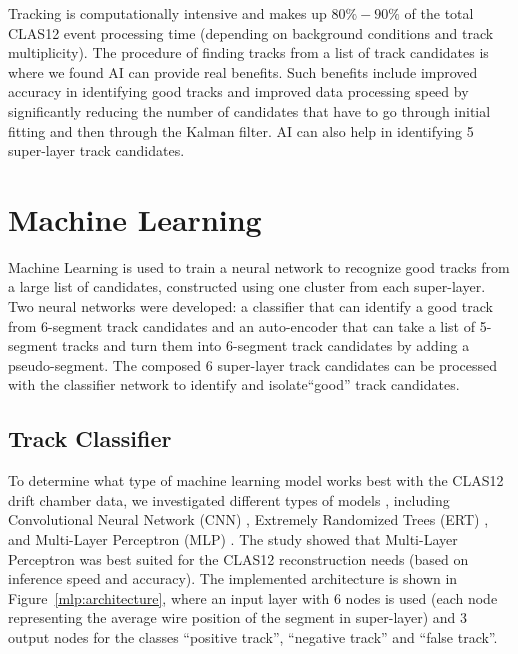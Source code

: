 \documentclass[aps,prl,preprint,12pt]{revtex4}
\begin{document}
Tracking is computationally intensive and makes up $80\%-90\%$ of the total CLAS12 event processing 
time (depending on background conditions and track multiplicity). The procedure of finding tracks from a 
list of track candidates is where we found AI can provide real benefits. Such benefits include improved 
accuracy in identifying good tracks and improved data processing speed by significantly reducing the 
number of candidates that have to go through initial fitting and then through the Kalman filter. AI can also 
help in identifying 5 super-layer track candidates.

\section{Machine Learning}

Machine Learning is used to train a neural network to recognize good tracks
 from a large list of candidates, constructed using one cluster from each super-layer.
 Two neural networks were developed: a classifier that can identify a good track from  
 6-segment track candidates and an auto-encoder that can take a list of 5-segment tracks 
 and turn them into 6-segment track candidates by adding a pseudo-segment. The composed 
 6 super-layer track candidates can be processed with the classifier network to identify and 
 isolate``good'' track candidates.


 
 \subsection{Track Classifier}
 
 To determine what type of machine learning model works best with the CLAS12 drift chamber data, 
 we investigated different types of models  \cite{Gavalian:2020oxg}, including Convolutional Neural 
 Network (CNN) , Extremely Randomized Trees (ERT) \cite{scikitlearn-extratreesclassifier}, and 
 Multi-Layer Perceptron (MLP) \cite{scikitlearn-mlpclassifier}. The study showed that Multi-Layer 
 Perceptron was best suited for the CLAS12 reconstruction needs (based on inference speed and accuracy). 
 The implemented architecture is shown in Figure~\ref{mlp:architecture}, where an input layer with 6 
 nodes is used (each node representing the average wire position of the segment in super-layer) and 3 
 output nodes for the classes ``positive track'', ``negative track'' and ``false track''.
 
\end{document}
